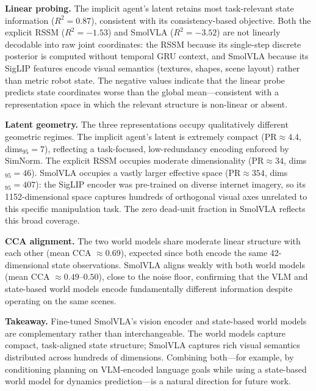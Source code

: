 \documentclass{article}
\begin{document}
\textbf{Linear probing.}
The implicit agent's latent retains most task-relevant state information
($R^2{=}0.87$), consistent with its consistency-based objective.
Both the explicit RSSM ($R^2{=}{-}1.53$) and SmolVLA ($R^2{=}{-}3.52$)
are not linearly decodable into raw joint coordinates:
the RSSM because its single-step discrete posterior is computed without
temporal GRU context, and SmolVLA because its SigLIP features encode visual
semantics (textures, shapes, scene layout) rather than metric robot state.
The negative values indicate that the linear probe predicts state coordinates
worse than the global mean—consistent with a representation space in which
the relevant structure is non-linear or absent.

\textbf{Latent geometry.}
The three representations occupy qualitatively different geometric regimes.
The implicit agent's latent is extremely compact (PR$\approx 4.4$, dims$_{95}{=}7$),
reflecting a task-focused, low-redundancy encoding enforced by SimNorm.
The explicit RSSM occupies moderate dimensionality (PR$\approx 34$, dims$_{95}{=}46$).
SmolVLA occupies a vastly larger effective space (PR$\approx 354$,
dims$_{95}{=}407$): the SigLIP encoder was pre-trained on diverse internet
imagery, so its 1152-dimensional space captures hundreds of orthogonal visual
axes unrelated to this specific manipulation task.
The zero dead-unit fraction in SmolVLA reflects this broad coverage.

\textbf{CCA alignment.}
The two world models share moderate linear structure with each other
(mean CCA $\approx 0.69$), expected since both encode the same 42-dimensional
state observations.
SmolVLA aligns weakly with both world models (mean CCA $\approx 0.49$–$0.50$),
close to the noise floor, confirming that the VLM and state-based world models
encode fundamentally different information despite operating on the same scenes.

\textbf{Takeaway.}
Fine-tuned SmolVLA's vision encoder and state-based world models are
complementary rather than interchangeable.
The world models capture compact, task-aligned state structure; SmolVLA captures
rich visual semantics distributed across hundreds of dimensions.
Combining both—for example, by conditioning planning on VLM-encoded language
goals while using a state-based world model for dynamics prediction—is a natural
direction for future work.



\end{document}
